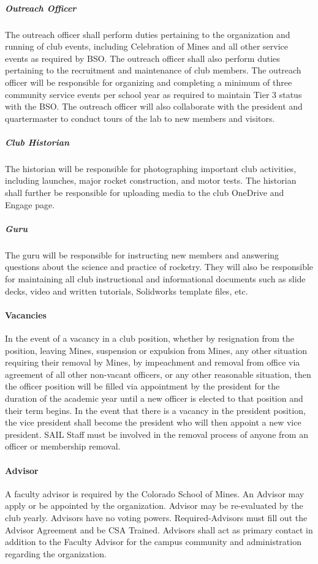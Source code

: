 \documentclass[12pt]{article}
\begin{document}
\subparagraph{Outreach Officer} The outreach officer shall perform duties pertaining to the organization and running of club events, 
including Celebration of Mines and all other service events as required by BSO. 
The outreach officer shall also perform duties pertaining to the recruitment and maintenance of club members. 
The outreach officer will be responsible for organizing and completing a minimum of three community service events per school year as required to maintain Tier 3 status with the BSO. 
The outreach officer will also collaborate with the president and quartermaster to conduct tours of the lab to new members and visitors.

\subparagraph{Club Historian} The historian will be responsible for photographing important club activities, 
including launches, major rocket construction, and motor tests. 
The historian shall further be responsible for uploading media to the club OneDrive and Engage page.

\subparagraph{Guru} The guru will be responsible for instructing new members and answering questions about the science and practice of rocketry. 
They will also be responsible for maintaining all club instructional and informational documents such as slide decks, 
video and written tutorials, Solidworks template files, etc.

\paragraph{Vacancies}
In the event of a vacancy in a club position, whether by resignation from the position, leaving Mines, suspension or expulsion from Mines, any other situation requiring their removal by Mines, by impeachment and removal from office via agreement of all other non-vacant officers, or any other reasonable situation, then the officer position will be filled via appointment by the president for the duration of the academic year until a new officer is elected to that position and their term begins. 
In the event that there is a vacancy in the president position, the vice president shall become the president who will then appoint a new vice president. 
SAIL Staff must be involved in the removal process of anyone from an officer or membership removal.

\paragraph{Advisor}
A faculty advisor is required by the Colorado School of Mines. 
An Advisor may apply or be appointed by the organization. 
Advisor may be re-evaluated by the club yearly. 
Advisors have no voting powers. 
Required-Advisors must fill out the Advisor Agreement and be CSA Trained. 
Advisors shall act as primary contact in addition to the Faculty Advisor for the campus community and administration regarding the organization. 
\end{document}
